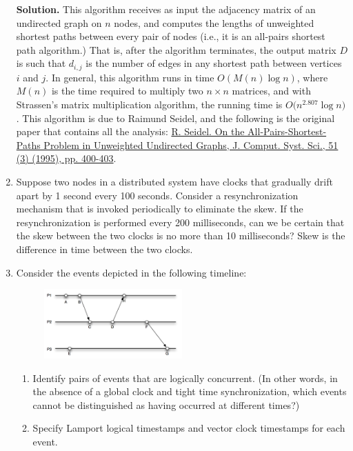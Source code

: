 \documentclass[11pt]{article}
\begin{document}
\begin{enumerate}
\textbf{Solution.} This algorithm receives as input the adjacency matrix of an undirected graph on $n$ nodes, and computes the lengths of unweighted shortest paths between every pair of nodes (i.e., it is an all-pairs shortest path algorithm.) That is, after the algorithm terminates, the output matrix $D$ is such that $d_{i,j}$ is the number of edges in any shortest path between vertices $i$ and $j$. In general, this algorithm runs in time $O(M(n)\log n)$, where $M(n)$ is the time required to multiply two $n \times n$ matrices, and with Strassen's matrix multiplication algorithm, the running time is $O\bigl(n^{2.807}\log n\bigr)$. This algorithm is due to Raimund Seidel, and the following is the original paper that contains all the analysis:
 \href{https://doi.org/10.1006/jcss.1995.1078}{R. Seidel. On the All-Pairs-Shortest-Paths Problem in Unweighted Undirected Graphs, J. Comput. Syst. Sci., 51 (3) (1995), pp. 400-403}.  


\item Suppose two nodes in a distributed system have clocks that gradually drift apart by 1 second every 100 seconds. Consider a resynchronization mechanism that is invoked periodically to eliminate the skew. If the resynchronization is performed every 200 milliseconds, can we be certain that the skew between the two clocks is no more than 10 milliseconds? Skew is the difference in time between the two clocks. 


\item Consider the events depicted in the following timeline:

\begin{figure}[h]\begin{center}
	\includegraphics[width=0.5\textwidth]{Clocks.png}
\end{center}\end{figure}

\begin{enumerate}
	\item Identify pairs of events that are logically concurrent. (In other words, in the absence of a global clock and tight time synchronization, which events cannot be distinguished as having occurred at different times?)
	\item Specify Lamport logical timestamps and vector clock timestamps for each event.
\end{enumerate}



\end{enumerate}
\end{document}
